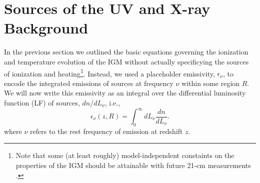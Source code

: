 %
%

\section{Sources of the UV and X-ray Background} \label{sec:sources}
In the previous section we outlined the basic equations governing the ionization and temperature evolution of the IGM without actually specificying the sources of ionization and heating\footnote{Note that some (at least roughly) model-independent constaints on the properties of the IGM should be attainable with future 21-cm measurements \cite{Cohen2017,Cohen2018,Mirocha2013}.}. Instead, we used a placeholder emissivity, $\epsilon_{\nu}$, to encode the integrated emissions of sources at frequency $\nu$ within some region $R$. We will now write this emissivity as an integral over the differential luminosity function (LF) of sources, $dn/dL_{\nu}$, i.e.,
\begin{equation}
	\epsilon_{\nu}(z,R) = \int_0^{\infty} dL_{\nu} \frac{dn}{dL_{\nu}} .
\end{equation}
where $\nu$ refers to the rest frequency of emission at redshift $z$. 

